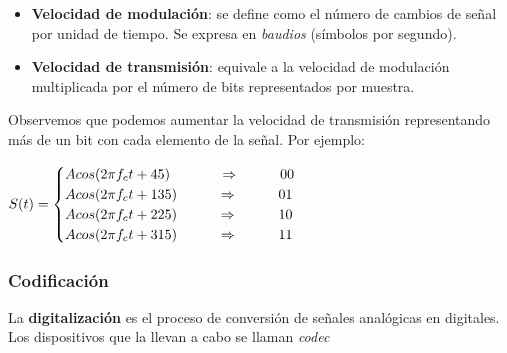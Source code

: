 \documentclass[]{article}
\begin{document}
\begin{itemize}
    \item \textbf{Velocidad de modulación}: se define como el número de cambios de señal por unidad de tiempo. Se expresa en \emph{baudios} (símbolos por segundo).
    \item \textbf{Velocidad de transmisión}: equivale a la velocidad de modulación multiplicada por el número de bits representados por muestra.
\end{itemize}

Observemos que podemos aumentar la velocidad de transmisión representando más de un bit con cada elemento de la señal. Por ejemplo:
\begin{center}
    $S(t) = \begin{cases}
        A cos(2 \pi f_c t + 45)\ \hspace{1.1cm}\Rightarrow\hspace{1cm}00\\
        A cos(2 \pi f_c t + 135)\hspace{1cm}\Rightarrow\hspace{1cm}01\\
        A cos(2 \pi f_c t + 225)\hspace{1cm}\Rightarrow\hspace{1cm}10\\
        A cos(2 \pi f_c t + 315)\hspace{1cm}\Rightarrow\hspace{1cm}11
    \end{cases}$
\end{center}

\subsubsection{Codificación}
La \textbf{digitalización} es el proceso de conversión de señales analógicas en digitales. Los dispositivos que la llevan a cabo se llaman \emph{codec}

\end{document}
